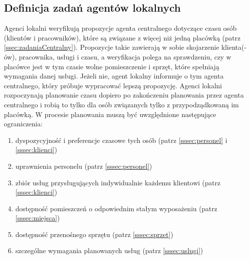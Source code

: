 \subsection{Definicja zadań agentów lokalnych}\label{ssec:zadaniaLokalny}
Agenci lokalni weryfikują propozycje agenta centralnego dotyczące czasu osób (klientów
i pracowników), które są związane z więcej niż jedną placówką (patrz \ref{ssec:zadaniaCentralny}).
Propozycje takie zawierają w sobie skojarzenie klienta(-ów), pracownika, usługi i czasu,
a weryfikacja polega na sprawdzeniu, czy w placówce jest w tym czasie wolne pomieszczenie i sprzęt,
które spełniają wymagania danej usługi. Jeżeli nie, agent lokalny informuje o tym agenta centralnego,
który próbuje wypracować lepszą propozycję.
Agenci lokalni rozpoczynają planowanie czasu dopiero po zakończeniu planowania przez
agenta centralnego i robią to tylko dla osób związanych tylko z przypodządkowaną im placówką.
W procesie planowania muszą być uwzględnione następujące ograniczenia:
\begin{enumerate}
	\item{dyspozycyjność i preferencje czasowe tych osób (patrz \ref{sssec:personel} i \ref{sssec:klienci})}
	\item{uprawnienia personelu (patrz \ref{sssec:personel})}
	\item{zbiór usług przysługujących indywidualnie każdemu klientowi (patrz \ref{sssec:klienci})}
	\item{dostępność pomieszczeń o odpowiednim stałym wyposażeniu (patrz \ref{sssec:miejsca})}
	\item{dostępność przenośnego sprzętu (patrz \ref{sssec:sprzet})}
	\item{szczególne wymagania planowanych usług (patrz \ref{sssec:uslugi})}
\end{enumerate}

